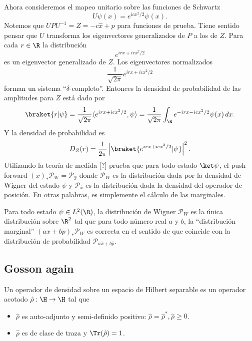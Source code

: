   Ahora consideremos el mapeo unitario sobre las funciones
  de Schwartz
  \[
    U\psi(x) = e^{icx^2 / 2} \psi(x).
  \] 
  Notemos que $UPU^{-1} = Z = -c \hat{x} + \hat{p}$ para
  funciones de prueba. Tiene sentido pensar que $U$ 
  transforma los eigenvectores generalizados de $P$ a los de
  $Z$. Para cada $r \in \R$ la distribución
  \[
    e^{irx + icx^2 / 2}
  \] 
  es un eigenvector generalizado de $Z$. Los eigenvectores
  normalizados
  \[
    \frac{1}{\sqrt{2\pi}} e^{irx + icx^2 / 2}
  \] 
  forman un sistema ``$\delta$-completo''. Entonces la
  densidad de probabilidad de las amplitudes para $Z$ está
  dado por
  \[
    \braket{r|\psi}
    = \frac{1}{\sqrt{2\pi}} \langle e^{irx + i cx^2 / 2},
    \psi \rangle
    = \frac{1}{\sqrt{2\pi}} \int_{\R} e^{-irx-icx^2 /
    2}\psi(x) \, dx.
  \] 
  Y la densidad de probabilidad es
  \[
    D_Z(r)
    = \frac{1}{2\pi} \left|
    \braket{e^{irx+icx^2 / 2}|\psi}
    \right|^2.
  \] 
  Utilizando la teoría de medida [?] prueba que para todo
  estado $\ket \psi$, el push-forward $(x)_* \mathcal P_W =
  \mathcal P_{\hat{x}}$ donde $\mathcal P_W$ es la
  distribución dada por la densidad de Wigner del estado
  $\psi$ y $\mathcal P_{\hat{x}}$ es la distribución dada la
  densidad del operador de posición. En otras palabras, es
  simplemente el cálculo de las marginales.

  \begin{proposition}
    Para todo estado $\psi \in L^2(\R)$, la distribución de
    Wigner $\mathcal P_W$ es la única distribución sobre
    $\R^{2}$ tal que para todo número real $a$ y $b$, la
    ``distribución marginal'' $(ax+bp)_{*} \mathcal P_W$ es
    correcta en el sentido de que coincide con la
    distribución de probabilidad $\mathcal P_{a \hat{x} + b
    \hat{p}}$.
  \end{proposition}

\subsection{Gosson again}

  \begin{definition}
    Un operador de densidad sobre un espacio de Hilbert
    separable es un operador acotado $\hat{\rho} : \H \to
    \H$ tal que
    \begin{itemize}
      \item $\hat{\rho}$ es auto-adjunto y semi-definido
        positivo: $\hat{\rho} = \hat{\rho}^{*}, \hat{\rho}
        \geq 0$.
      \item $\hat{\rho}$ es de clase de traza y
        $\Tr(\hat{\rho}) = 1$.
    \end{itemize}
  \end{definition}

